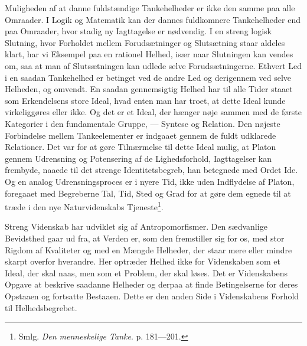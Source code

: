 \documentclass[12pt]{article}
\newcommand{\opage}[1]{\marginnote{\footnotesize\textit{[#1]}}}
\begin{document}
Muligheden af at danne fuldstændige Tankehelheder er ikke den samme
paa alle Omraader. I Logik og Matematik kan der dannes fuldkomnere
Tankehelheder end paa Omraader, hvor stadig ny Iagttagelse er
nødvendig. I en streng logisk Slutning, hvor Forholdet mellem
Forudsætninger og Slutsætning staar aldeles klart, har vi Eksempel paa
en rationel Helhed, især naar Slutningen kan vendes om, saa at man af
Slutsætningen kan udlede selve Forudsætningerne. Ethvert Led i en
saadan Tankehelhed er betinget ved de andre Led og derigennem ved selve
Helheden, og omvendt. En
\setcounter{footnote}{0}%
\opage{10}saadan gennemsigtig Helhed har til alle Tider staaet som
Erkendelsens store Ideal, hvad enten man har troet, at dette Ideal
kunde virkeliggøres eller ikke. Og det er et Ideal, der hænger nøje
sammen med de første Kategorier i den fundamentale Gruppe, --- Syntese
og Relation. Den nøjeste Forbindelse mellem Tankeelementer er indgaaet
gennem de fuldt udklarede Relationer. Det var for at gøre Tilnærmelse
til dette Ideal mulig, at Platon gennem Udrensning og Potensering af de
Lighedsforhold, Iagttagelser kan frembyde, naaede til det strenge
Identitetsbegreb, han betegnede med Ordet \guillemotright{}Ide\guillemotleft{}. Og en analog
Udrensningsproces er i nyere Tid, ikke uden Indflydelse af Platon,
foregaaet med Begreberne Tal, Tid, Sted og Grad for at gøre dem
egnede til at træde i den nye Naturvidenskabs
Tjeneste\footnote{Smlg. \textit{Den menneskelige Tanke}. p.
181---201.}.

Streng Videnskab har udviklet sig af \guillemotright{}Antropomorfismer\guillemotleft{}. Den
sædvanlige Bevidsthed gaar ud fra, at Verden er, som den fremstiller
sig for os, med stor Rigdom af Kvaliteter og med en Mængde Helheder,
der staar mere eller mindre skarpt overfor hverandre. Her optræder
Helhed ikke for Videnskaben som et Ideal, der skal naas, men som et
Problem, der skal løses. Det er Videnskabens Opgave at beskrive
saadanne Helheder og derpaa at finde Betingelserne for deres Opstaaen
og fortsatte Bestaaen. Dette er den anden Side i Videnskabens Forhold
til Helhedsbegrebet.
\end{document}

